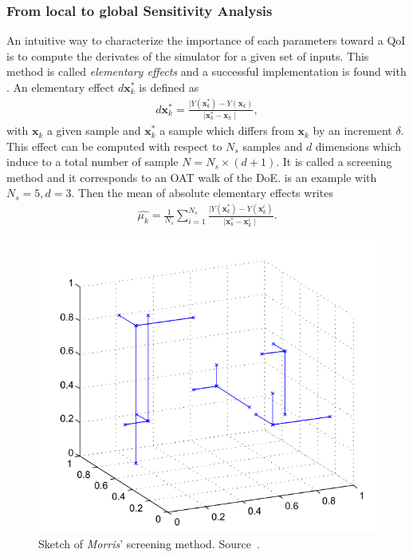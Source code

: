 \subsubsection{From local to global Sensitivity Analysis}

An intuitive way to characterize the importance of each parameters toward a QoI is to compute the derivates of the simulator for a given set of inputs. This method is called \emph{elementary effects} and a successful implementation is found with \citet{morris1991}. An elementary effect $d\mathbf{x}_{k}^*$ is defined as
\begin{align}
d\mathbf{x}_{k}^* = \frac{ \mid Y(\mathbf{x}_{k}^*) -  Y(\mathbf{x}_{k})}{\mid \mathbf{x}_{k}^* - \mathbf{x}_{k}  \mid},
\end{align}
\noindent with $\mathbf{x}_{k}$ a given sample and $\mathbf{x}_{k}^*$ a sample which differs from $\mathbf{x}_{k}$ by an increment $\delta$. This effect can be computed with respect to $N_s$ samples and $d$ dimensions which induce to a total number of sample $N = N_s\times(d + 1)$. It is called a screening method and it corresponds to an OAT walk of the DoE.  is an example with $N_s = 5, d = 3$. Then the mean of absolute elementary effects writes
\begin{align}
\hat{\mu_k} = \frac{1}{N_s} \sum_{i=1}^{N_s} \frac{ \mid Y(\mathbf{x}_{k}^*) -  Y(\mathbf{x}_{k}^i)}{\mid \mathbf{x}_{k}^* - \mathbf{x}_{k}^i  \mid}.
\end{align}

\begin{figure}[!h]
\centering
\includegraphics[width=0.8\linewidth,keepaspectratio]{fig/literature/morris.png}
\caption{Sketch of \emph{Morris}' screening method. Source~\cite{Becker2018}.}
\label{fig:morris}
\end{figure}

